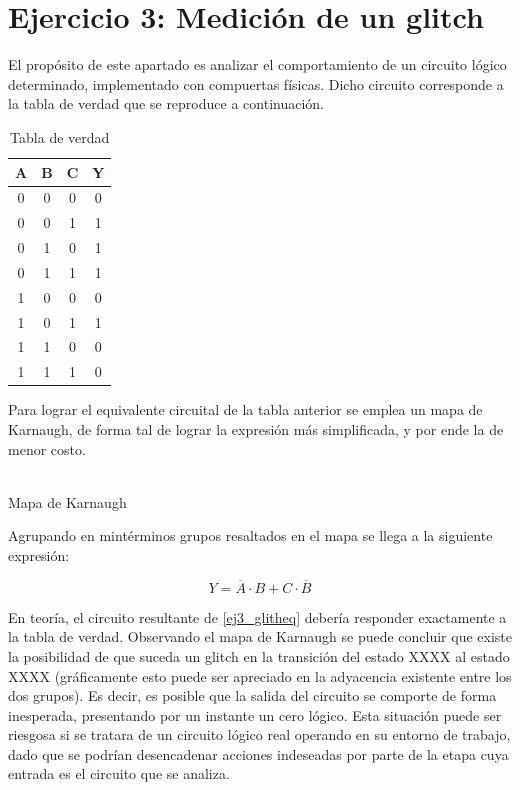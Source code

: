 \section{Ejercicio 3: Medici\'on de un glitch}

El prop\'osito de este apartado es analizar el comportamiento de un circuito l\'ogico determinado, implementado con compuertas f\'isicas. Dicho circuito corresponde a la tabla de verdad que se reproduce a continuaci\'on.

\begin{table}[]
\centering
\caption{Tabla de verdad}
\label{tab:ej3_tabla_verdad}
\begin{tabular}{ccc|c}
A & B & C & Y \\ \hline
0 & 0 & 0 & 0 \\
0 & 0 & 1 & 1 \\
0 & 1 & 0 & 1 \\
0 & 1 & 1 & 1 \\
1 & 0 & 0 & 0 \\
1 & 0 & 1 & 1 \\
1 & 1 & 0 & 0 \\
1 & 1 & 1 & 0
\end{tabular}
\end{table}

Para lograr el equivalente circuital de la tabla anterior se emplea un mapa de Karnaugh, de forma tal de lograr la expresi\'on m\'as simplificada, y por ende la de menor costo.

\begin{center}
    \begin{Karnaughvuit}
        \label{Karnaugh_glitch}
	\end{Karnaughvuit}\\
Mapa de Karnaugh
\end{center}


Agrupando en mint\'erminos grupos resaltados en el mapa se llega a la siguiente expresi\'on:

\begin{equation}
\label{ej3_glitheq}
 Y = \overline{A}\cdot B + C \cdot \overline{B}
\end{equation}

En teor\'ia, el circuito resultante de \ref{ej3_glitheq} deber\'ia responder exactamente a la tabla de verdad. Observando el mapa de Karnaugh se puede concluir que existe la posibilidad de que suceda un glitch en la transici\'on del estado XXXX al estado XXXX (gr\'aficamente esto puede ser apreciado en la adyacencia existente entre los dos grupos). Es decir, es posible que la salida del circuito se comporte de forma inesperada, presentando por un instante un cero l\'ogico. Esta situaci\'on puede ser riesgosa si se tratara de un circuito l\'ogico real operando en su entorno de trabajo, dado que se podr\'ian desencadenar acciones indeseadas por parte de la etapa cuya entrada es el circuito que se analiza.

